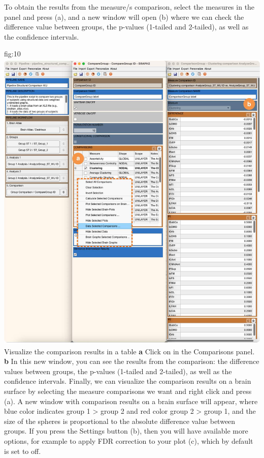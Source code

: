 \documentclass[justified]{tufte-handout}
\begin{document}
To obtain the results from the measure/s comparison, select the measures in the  panel and press ({a}), and a new window will open ({b}) where we can check the difference value between groups, the p-values (1-tailed and 2-tailed), as well as the confidence intervals.

	{fig:10}
	{
	\includegraphics{fig10.jpg}
	}
	{Visualize the comparison results in a table}
	{
	{\bf a} Click on  in the Comparisons panel.
	{\bf b} In this new window, you can see the results from the comparison: the difference values between groups, the p-values (1-tailed and 2-tailed), as well as the confidence intervals.
	}
Finally, we can visualize the comparison results on a brain surface by selecting the measure comparisons we want and right click and press  ({a}). A new window with comparison results on a brain surface will appear, where blue color indicates group 1 > group 2 and red color group 2 > group 1, and the size of the spheres is proportional to the absolute difference value between groups. If you press the Settings button ({b}), then you will have available more options, for example to apply FDR correction to your plot ({c}), which by default is set to off.
\end{document}
